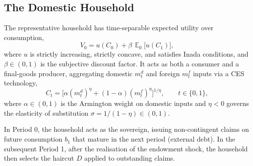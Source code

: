 \documentclass[11pt]{article}
\DeclareMathOperator{\E}{\mathbb{E}}
\theoremstyle{definition}
\theoremstyle{plain}
\theoremstyle{remark}
\newcommand{\mf}{m^{f}}
\newcommand{\md}{m^{d}}
\begin{document}
\subsection{The Domestic Household} \label{sec:household}

The representative household has time-separable expected utility over consumption,
\begin{equation}\label{eq:V0}
V_0 = u(C_0) + \beta \, \E_0\bigl[u(C_1)\bigr],
\end{equation}
where $u$ is strictly increasing, strictly concave, and satisfies Inada conditions, and $\beta \in (0,1)$ is the subjective discount factor. It acts as both a consumer and a final-goods producer, aggregating domestic $\md_t$ and foreign $\mf_t$ inputs via a CES technology,
\begin{equation}\label{eq:CES}
C_t = \bigl[\alpha (\md_t)^{\eta} + (1-\alpha)(\mf_t)^{\eta}\bigr]^{1/\eta}, \qquad t \in \{0,1\},
\end{equation}
where $\alpha \in (0,1)$ is the Armington weight on domestic inputs and $\eta < 0$ governs the elasticity of substitution $\sigma = 1/(1-\eta) \in (0,1)$.

In Period 0, the household acts as the sovereign, issuing non-contingent claims on future consumption $b_1$ that mature in the next period (external debt). In the subsequent Period 1, after the realisation of the endowment shock, the household then selects the haircut $D$ applied to outstanding claims.
\end{document}
